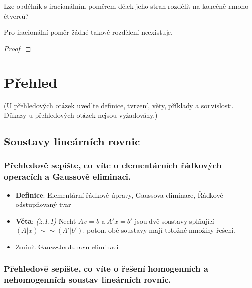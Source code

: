 \documentclass[10pt,a4paper]{article}
\begin{document}
{Lze obdélník s iracionálním poměrem délek jeho stran rozdělit na konečně mnoho čtverců?

Pro iracionální poměr žádné takové rozdělení neexistuje.
\begin{proof}

\end{proof}


\newpage
\section{Přehled}
(U  přehledových  otázek  uved’te  definice,  tvrzení,  věty,  příklady  a  souvislosti.  Důkazy  u přehledových otázek nejsou vyžadovány.)
\subsection{Soustavy lineárních rovnic}
\subsubsection{Přehledově sepište, co víte o elementárních řádkových operacích a Gaussově eliminaci.}

\begin{itemize}[label=$\circ$]
    \item \textbf{Definice}: Elementární řádkové úpravy, Gaussova eliminace, Řádkově odstupňovaný tvar
    \item \textbf{Věta}: \textit{(2.1.1)} Nechť $Ax=b$ a $A'x=b'$ jsou dvě soustavy splňující $(A|x) \sim \sim (A'|b')$, potom obě soustavy mají totožné množiny řešení.
\item Zmínit Gauss-Jordanovu eliminaci
\end{itemize}

\subsubsection{Přehledově sepište, co víte o řešení homogenních a nehomogenních soustav lineárních rovnic.}

}
\end{document}
